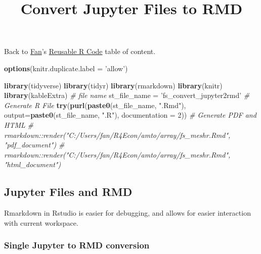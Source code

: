 \documentclass[
]{article}
\title{Convert Jupyter Files to RMD}
\author{}
\date{\vspace{-2.5em}}
\newenvironment{Shaded}{\begin{snugshade}}{\end{snugshade}}
\newcommand{\CommentTok}[1]{\textcolor[rgb]{0.56,0.35,0.01}{\textit{#1}}}
\newcommand{\DataTypeTok}[1]{\textcolor[rgb]{0.13,0.29,0.53}{#1}}
\newcommand{\DecValTok}[1]{\textcolor[rgb]{0.00,0.00,0.81}{#1}}
\newcommand{\KeywordTok}[1]{\textcolor[rgb]{0.13,0.29,0.53}{\textbf{#1}}}
\newcommand{\NormalTok}[1]{#1}
\newcommand{\StringTok}[1]{\textcolor[rgb]{0.31,0.60,0.02}{#1}}
\begin{document}
\maketitle

Back to \href{https://fanwangecon.github.io}{Fan}'s
\href{https://fanwangecon.github.io/R4Econ/}{Reusable R Code} table of
content.

\begin{Shaded}
\begin{Highlighting}[]
\KeywordTok{options}\NormalTok{(}\DataTypeTok{knitr.duplicate.label =} \StringTok{'allow'}\NormalTok{)}
\end{Highlighting}
\end{Shaded}

\begin{Shaded}
\begin{Highlighting}[]
\KeywordTok{library}\NormalTok{(tidyverse)}
\KeywordTok{library}\NormalTok{(tidyr)}
\KeywordTok{library}\NormalTok{(rmarkdown)}
\KeywordTok{library}\NormalTok{(knitr)}
\KeywordTok{library}\NormalTok{(kableExtra)}
\CommentTok{# file name}
\NormalTok{st_file_name =}\StringTok{ 'fs_convert_jupyter2rmd'}
\CommentTok{# Generate R File}
\KeywordTok{try}\NormalTok{(}\KeywordTok{purl}\NormalTok{(}\KeywordTok{paste0}\NormalTok{(st_file_name, }\StringTok{".Rmd"}\NormalTok{), }\DataTypeTok{output=}\KeywordTok{paste0}\NormalTok{(st_file_name, }\StringTok{".R"}\NormalTok{), }\DataTypeTok{documentation =} \DecValTok{2}\NormalTok{))}
\CommentTok{# Generate PDF and HTML}
\CommentTok{# rmarkdown::render("C:/Users/fan/R4Econ/amto/array/fs_meshr.Rmd", "pdf_document")}
\CommentTok{# rmarkdown::render("C:/Users/fan/R4Econ/amto/array/fs_meshr.Rmd", "html_document")}
\end{Highlighting}
\end{Shaded}

\hypertarget{jupyter-files-and-rmd}{%
\subsection{Jupyter Files and RMD}\label{jupyter-files-and-rmd}}

Rmarkdown in Rstudio is easier for debugging, and allows for easier
interaction with current workspace.

\hypertarget{single-jupyter-to-rmd-conversion}{%
\subsubsection{Single Jupyter to RMD
conversion}\label{single-jupyter-to-rmd-conversion}}
\end{document}
